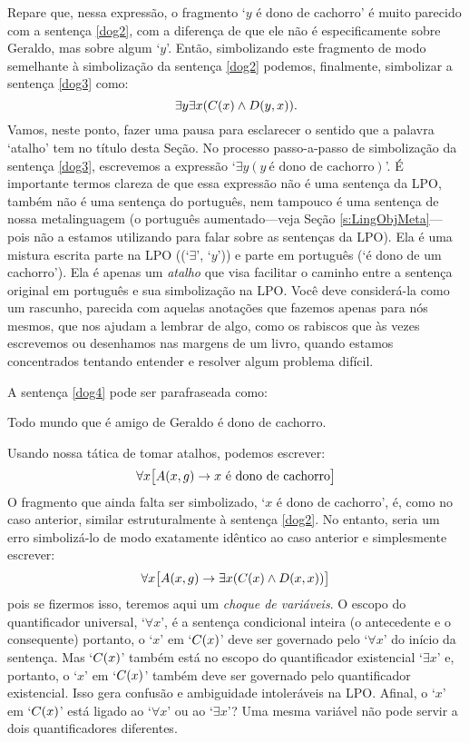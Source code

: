Repare que, nessa expressão, o fragmento `$y$ é dono de cachorro' é muito parecido com a sentença \ref{dog2}, com a diferença de que ele não é especificamente sobre Geraldo, mas sobre algum `$y$'.
Então, simbolizando este fragmento de modo semelhante à simbolização da sentença \ref{dog2} podemos, finalmente, simbolizar a sentença \ref{dog3} como:
$$\exists y \exists x(\mathord{C}(x) \wedge \mathord{D}(y,x)).$$
Vamos, neste ponto, fazer uma pausa para esclarecer o sentido que a palavra `atalho' tem no título desta Seção.
No processo passo-a-passo de simbolização da sentença \ref{dog3}, escrevemos a expressão `$\exists y(y\ \text{é dono de cachorro})$'.
É importante termos clareza de que essa expressão não é uma sentença da LPO, também não é uma sentença do português, nem tampouco é uma sentença de nossa metalinguagem (o português aumentado---veja Seção \ref{s:LingObjMeta}---pois não a estamos utilizando para falar sobre as sentenças da LPO).
Ela é uma mistura escrita parte na LPO ((`$\exists$', `$y$')) e parte em português (`é dono de um cachorro').
Ela é apenas um  \emph{atalho} que visa facilitar o caminho entre a sentença original em português e sua simbolização na LPO.
Você deve considerá-la como um rascunho, parecida com aquelas anotações que fazemos apenas para nós mesmos, que nos ajudam a lembrar de algo, como os rabiscos que às vezes escrevemos ou desenhamos nas margens de um livro, quando estamos concentrados tentando entender e resolver algum problema difícil.

A sentença \ref{dog4} pode ser parafraseada como:
\begin{center}
	Todo mundo que é amigo de Geraldo é dono de cachorro.
\end{center}
Usando nossa tática de tomar atalhos, podemos escrever:
$$\forall x \bigl[\mathord{A}(x,g) \rightarrow x \text{ é dono de cachorro}\bigr]$$
O fragmento que ainda falta ser simbolizado, `$x$ é dono de cachorro', é, como no caso anterior, similar estruturalmente à sentença \ref{dog2}.
No entanto, seria um erro simbolizá-lo de modo exatamente idêntico ao caso anterior e simplesmente escrever:
$$\forall x \bigl[\mathord{A}(x,g) \rightarrow \exists x(\mathord{C}(x) \wedge \mathord{D}(x,x))\bigr]$$
pois se fizermos isso, teremos aqui um \emph{choque de variáveis}.
O escopo do quantificador universal, `$\forall x$', é a sentença condicional inteira (o antecedente e o consequente) portanto, o `$x$' em `$\mathord{C}(x)$' deve ser governado pelo `$\forall x$' do início da sentença.
Mas `$\mathord{C}(x)$' também está no escopo do quantificador existencial `$\exists x$' e, portanto, o `$x$' em `$\mathord{C}(x)$' também deve ser governado pelo quantificador existencial.
Isso gera confusão e ambiguidade intoleráveis na LPO.
Afinal, o `$x$' em `$\mathord{C}(x)$' está ligado ao `$\forall x$' ou ao `$\exists x$'?
Uma mesma variável não pode servir a dois quantificadores diferentes.

